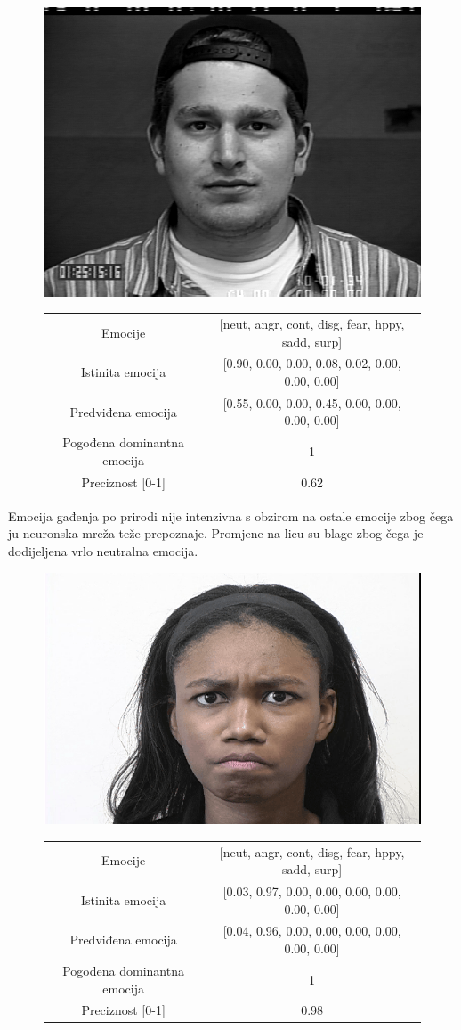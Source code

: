 \documentclass[times, utf8, zavrsni,numeric,pstricks]{fer}
\begin{document}
\begin{figure}[H]
\centering
		\includegraphics[width=0.3\linewidth, keepaspectratio]{S134_008_00000002.png}
		\begin{tabular}
					{|c|c|}\hline
					Emocije & [neut, angr, cont, disg, fear, hppy, sadd, surp]\\
					Istinita emocija & [0.90, 0.00, 0.00, 0.08, 0.02, 0.00, 0.00, 0.00] \\
					Predviđena emocija	& [0.55, 0.00, 0.00, 0.45, 0.00, 0.00, 0.00, 0.00] \\
					Pogođena dominantna emocija & 1\\
					Preciznost [0-1] & 0.62\\
					\hline
		\end{tabular}
	\caption{}
	\label{aa}
\end{figure}

Emocija gađenja po prirodi nije intenzivna s obzirom na ostale emocije zbog čega ju neuronska mreža teže prepoznaje. Promjene na licu su blage zbog čega je dodijeljena vrlo neutralna emocija.

\begin{figure}[H]
\centering
		\includegraphics[width=0.3\linewidth, keepaspectratio]{S501_001_00000065.png}
		\begin{tabular}
					{|c|c|}\hline
					Emocije & [neut, angr, cont, disg, fear, hppy, sadd, surp]\\
					Istinita emocija & [0.03, 0.97, 0.00, 0.00, 0.00, 0.00, 0.00, 0.00] \\
					Predviđena emocija	& [0.04, 0.96, 0.00, 0.00, 0.00, 0.00, 0.00, 0.00] \\								Pogođena dominantna emocija & 1\\
					Preciznost [0-1] & 0.98\\
					\hline
		\end{tabular}
\end{figure}
\end{document}
